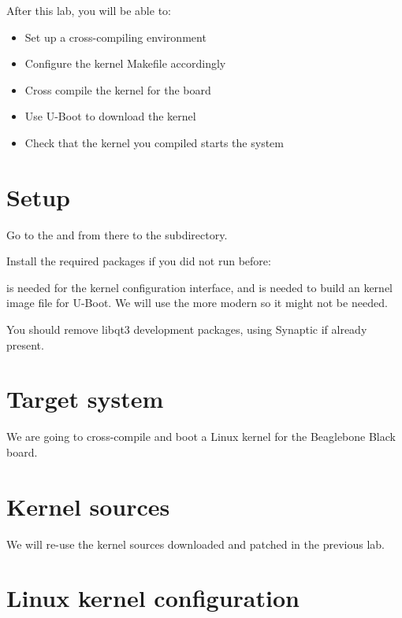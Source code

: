 
After this lab, you will be able to:
\begin{itemize}
\item Set up a cross-compiling environment
\item Configure the kernel Makefile accordingly
\item Cross compile the kernel for the \devboard board
\item Use U-Boot to download the kernel
\item Check that the kernel you compiled starts the system
\end{itemize}

\section{Setup}

Go to the \labdir and from there to the  subdirectory.

Install the required packages if you did not run  before:


 is needed for the  kernel configuration interface, and 
is needed to build an  kernel image file for U-Boot. We will use the more modern 
so it might not be needed.

You should remove libqt3 development packages, using Synaptic if already present.

\section{Target system}

We are going to cross-compile and boot a Linux kernel for the Beaglebone Black
board.

\section{Kernel sources}

We will re-use the kernel sources downloaded and patched in the
previous lab.

\clearpage

\section{Linux kernel configuration}


